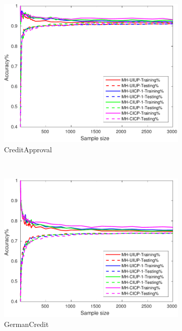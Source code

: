 \begin{figure}[ht]
\begin{subfigure}[b]{0.3\textwidth}
		\centering
  	\includegraphics[width=\textwidth]{figs/PLPTF/Trees/CreditApprovalDownsampledFurther_Trees_MH.pdf}
  	\caption{CreditApproval}
		\label{fig:Crd2}
	\end{subfigure}
  \\
  \begin{subfigure}[b]{0.3\textwidth}
		\centering
  	\includegraphics[width=\textwidth]{figs/PLPTF/Trees/GermanCreditDownsampledFurther_Trees_MH.pdf}
  	\caption{GermanCredit}
		\label{fig:G2}
	\end{subfigure}
  \begin{subfigure}[b]{0.3\textwidth}
		\centering

\end{subfigure}
\end{figure}
